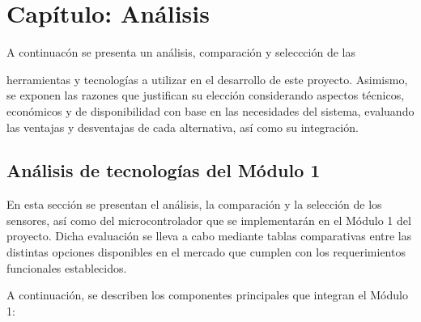 
\section{Capítulo: Análisis}
\label{sec:cap5}
A continuacón se presenta un análisis, comparación y seleccción de las

herramientas y tecnologías a utilizar en el desarrollo de este proyecto.
Asimismo, se exponen las razones que justifican su elección 
considerando aspectos técnicos, económicos y de disponibilidad 
con base en las necesidades del sistema, evaluando las ventajas y desventajas 
de cada alternativa, así como su integración.
\subsection{Análisis de tecnologías del Módulo 1}
\label{sec:mod1}
En esta sección se presentan el análisis, la comparación y la selección de los sensores, 
así como del microcontrolador que se implementarán en el Módulo 1 del proyecto. 
Dicha evaluación se lleva a cabo mediante tablas comparativas entre 
las distintas opciones disponibles en el mercado que cumplen con los
requerimientos funcionales establecidos.

A continuación, se describen los componentes principales que integran el Módulo 1:
